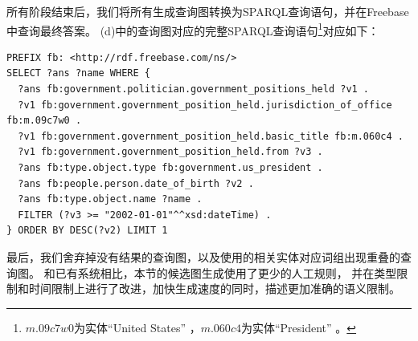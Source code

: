 所有阶段结束后，我们将所有生成查询图转换为SPARQL查询语句，并在Freebase中查询最终答案。
(d)中的查询图对应的完整SPARQL查询语句\footnote{
$m.09c7w0$为实体``United States'' ，$m.060c4$为实体``President'' 。}对应如下：
\begin{lstlisting}[caption={SPARQL查询语句示例}]
PREFIX fb: <http://rdf.freebase.com/ns/>
SELECT ?ans ?name WHERE {
  ?ans fb:government.politician.government_positions_held ?v1 .
  ?v1 fb:government.government_position_held.jurisdiction_of_office fb:m.09c7w0 .
  ?v1 fb:government.government_position_held.basic_title fb:m.060c4 .
  ?v1 fb:government.government_position_held.from ?v3 .
  ?ans fb:type.object.type fb:government.us_president .
  ?ans fb:people.person.date_of_birth ?v2 .
  ?ans fb:type.object.name ?name .
  FILTER (?v3 >= "2002-01-01"^^xsd:dateTime) .
} ORDER BY DESC(?v2) LIMIT 1
\end{lstlisting}
最后，我们舍弃掉没有结果的查询图，以及使用的相关实体对应词组出现重叠的查询图。
和已有系统相比，本节的候选图生成使用了更少的人工规则，
并在类型限制和时间限制上进行了改进，加快生成速度的同时，描述更加准确的语义限制。


